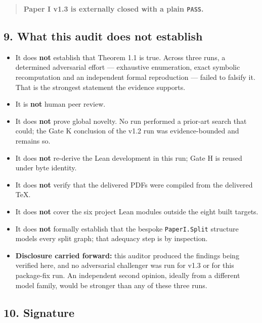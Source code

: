 \documentclass[
  9pt,
  a4paper,
]{article}
\providecommand{\tightlist}{%
  \setlength{\itemsep}{0pt}\setlength{\parskip}{0pt}}
\begin{document}
\begin{quote}
\textbf{Paper I v1.3 is externally closed with a plain \texttt{PASS}.}
\end{quote}

\subsection{9. What this audit does not
establish}\label{9-what-this-audit-does-not-establish}

\begin{itemize}
\tightlist
\item
  It does \textbf{not} establish that Theorem 1.1 is true. Across three
  runs, a determined adversarial effort --- exhaustive enumeration,
  exact symbolic recomputation and an independent formal reproduction
  --- failed to falsify it. That is the strongest statement the evidence
  supports.
\item
  It is \textbf{not} human peer review.
\item
  It does \textbf{not} prove global novelty. No run performed a
  prior-art search that could; the Gate K conclusion of the v1.2 run was
  evidence-bounded and remains so.
\item
  It does \textbf{not} re-derive the Lean development in this run; Gate
  H is reused under byte identity.
\item
  It does \textbf{not} verify that the delivered PDFs were compiled from
  the delivered TeX.
\item
  It does \textbf{not} cover the six project Lean modules outside the
  eight built targets.
\item
  It does \textbf{not} formally establish that the bespoke
  \texttt{PaperI.Split} structure models every split graph; that
  adequacy step is by inspection.
\item
  \textbf{Disclosure carried forward:} this auditor produced the
  findings being verified here, and no adversarial challenger was run
  for v1.3 or for this package-fix run. An independent second opinion,
  ideally from a different model family, would be stronger than any of
  these three runs.
\end{itemize}

\subsection{10. Signature}\label{10-signature}
\end{document}
